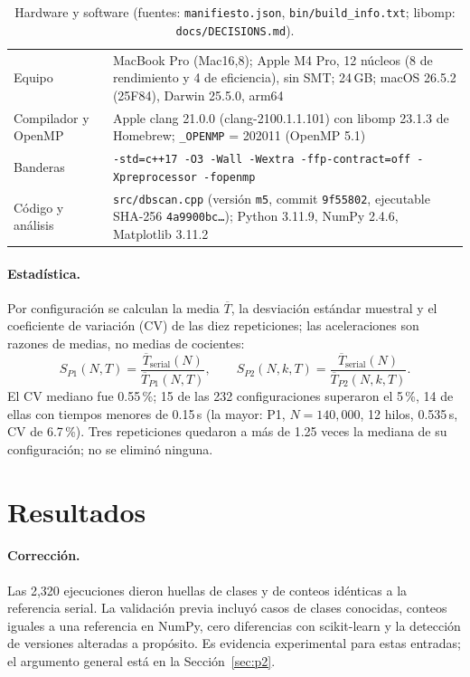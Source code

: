 \documentclass[11pt,letterpaper]{article}
\newcommand{\code}[1]{\texttt{#1}}
\newcommand{\Tser}{\overline{T}_{\mathrm{serial}}}
\begin{document}
\begin{table}[t]
\centering\small
\caption{Hardware y software (fuentes: \code{manifiesto.json}, \code{bin/build\_info.txt}; libomp: \code{docs/DECISIONS.md}).}
\label{tab:hw}
\begin{tabularx}{\textwidth}{@{}lX@{}}
\toprule
Equipo & MacBook Pro (Mac16,8); Apple M4 Pro, 12 núcleos (8 de rendimiento y 4 de eficiencia), sin SMT; 24\,GB;
macOS 26.5.2 (25F84), Darwin 25.5.0, arm64\\
Compilador y OpenMP & Apple clang 21.0.0 (clang-2100.1.1.101) con libomp 23.1.3 de Homebrew; \code{\_OPENMP} = 202011 (OpenMP 5.1)\\
Banderas & \code{-std=c++17 -O3 -Wall -Wextra -ffp-contract=off -Xpreprocessor -fopenmp}\\
Código y análisis & \code{src/dbscan.cpp} (versión \code{m5}, commit \code{9f55802}, ejecutable SHA-256
\code{4a9900bc\ldots}); Python 3.11.9, NumPy 2.4.6, Matplotlib 3.11.2\\
\bottomrule
\end{tabularx}
\end{table}

\paragraph{Estadística.} Por configuración se calculan la media $\overline T$, la desviación estándar muestral y el
coeficiente de variación (CV) de las diez repeticiones; las aceleraciones son razones de medias, no medias de
cocientes:
\begin{equation}\label{eq:speedup}
  S_{P1}(N,T)=\frac{\Tser(N)}{\overline T_{P1}(N,T)},\qquad
  S_{P2}(N,k,T)=\frac{\Tser(N)}{\overline T_{P2}(N,k,T)}.
\end{equation}
El CV mediano fue 0.55\,\%; 15 de las 232 configuraciones superaron el 5\,\%, 14 de ellas con tiempos menores de 0.15\,s (la mayor: P1, $N=140{,}000$, 12 hilos, 0.535\,s, CV de 6.7\,\%). Tres repeticiones quedaron a más de 1.25
veces la mediana de su configuración; no se eliminó ninguna.

\section{Resultados}\label{sec:resultados}

\paragraph{Corrección.} Las 2,320 ejecuciones dieron huellas de clases y de conteos idénticas a la referencia
serial. La validación previa incluyó casos de clases conocidas, conteos iguales a una referencia en NumPy, cero
diferencias con scikit-learn y la detección de versiones alteradas a propósito. Es evidencia experimental para estas
entradas; el argumento general está en la Sección~\ref{sec:p2}.
\end{document}
